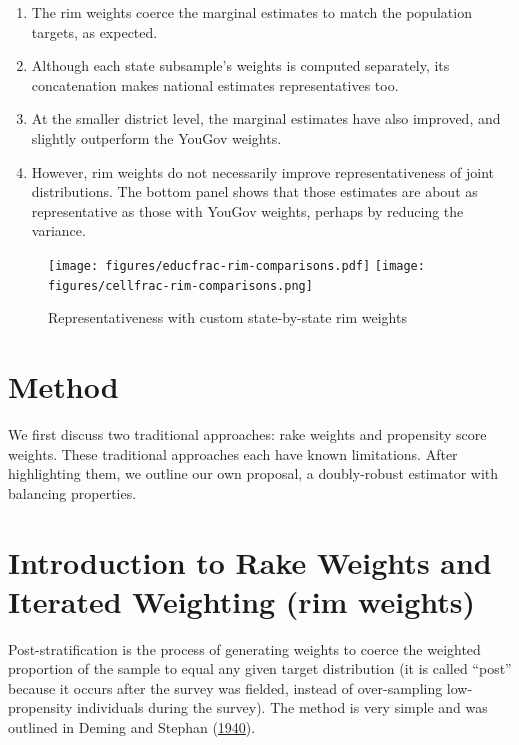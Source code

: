 \documentclass[11pt]{article}
\begin{document}
\medskip
\begin{enumerate}
\item The rim weights coerce the marginal estimates to match the population targets, as expected.
\item Although each state subsample's weights is computed separately, its concatenation makes national estimates representatives too. 
\item At the smaller district level, the marginal estimates have also improved, and slightly outperform the YouGov weights.
\item However, rim weights do not necessarily improve representativeness of joint distributions. The bottom panel shows that those estimates are about as representative as those with YouGov weights, perhaps by reducing the variance.
\end{enumerate}

\FloatBarrier

\begin{figure}[!htbp]
\centering
\caption{Representativeness with custom state-by-state rim weights \label{fig:rim-comparisons}}
\texttt{[image: figures/educfrac-rim-comparisons.pdf]}
\texttt{[image: figures/cellfrac-rim-comparisons.png]}
\end{figure}

\FloatBarrier

\pagebreak


\appendix

\section*{Method}

We first discuss two traditional approaches: rake weights and propensity score weights. These traditional approaches each have known limitations. After highlighting them, we outline our own proposal, a doubly-robust estimator with balancing properties.

\section{Introduction to Rake Weights and Iterated Weighting (rim weights)}

Post-stratification is the process of generating weights to coerce the weighted proportion of the sample to equal any given target distribution (it is called ``post'' because it occurs after the survey was fielded, instead of over-sampling low-propensity individuals during the survey). The method is very simple and was outlined in Deming and Stephan (\href{https://projecteuclid.org/download/pdf_1/euclid.aoms/1177731829}{1940}). 
\end{document}
